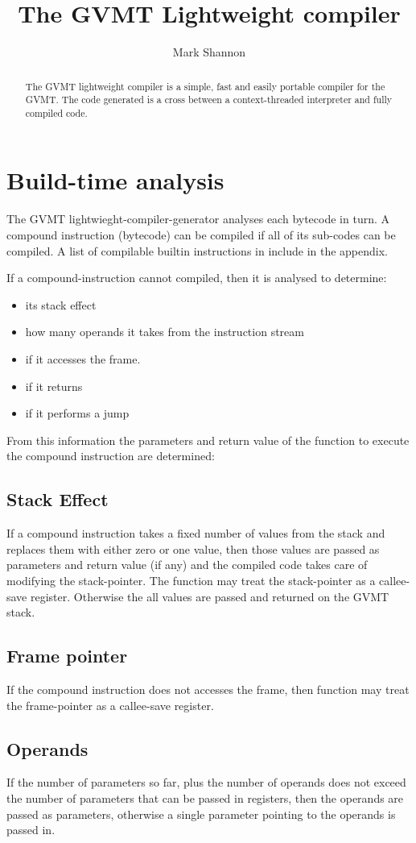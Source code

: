 \documentclass[a4paper,10pt]{article}
\title{The GVMT Lightweight compiler}
\author{Mark Shannon}
\date{}
\begin{document}
\maketitle

\begin{abstract}
The GVMT lightweight compiler is a simple, fast and easily portable compiler for the GVMT.
The code generated is a cross between a context-threaded interpreter and fully compiled code.
\end{abstract}

\section{Build-time analysis}
The GVMT lightwieght-compiler-generator analyses each bytecode in turn. A compound instruction (bytecode) can be compiled if all of its sub-codes can be compiled. A list of compilable builtin instructions in include in the appendix.

If a compound-instruction cannot compiled, then it is analysed to determine:
\begin{itemize}
\item its stack effect
\item how many operands it takes from the instruction stream
\item if it accesses the frame.
\item if it returns
\item if it performs a jump
\end{itemize}

From this information the parameters and return value of the function to execute the compound instruction are determined:
\subsection{Stack Effect}
If a compound instruction takes a fixed number of values from the stack and replaces them with either zero or one value, then those values are passed as parameters and return value (if any) and the compiled code takes care of modifying the stack-pointer. The function may treat the stack-pointer as a callee-save register.
Otherwise the all values are passed and returned on the GVMT stack.
\subsection{Frame pointer}
If the compound instruction does not accesses the frame, then function may treat the frame-pointer as a callee-save register.
\subsection{Operands}
If the number of parameters so far, plus the number of operands does not exceed the number of parameters that can be passed in registers, then the operands are passed as parameters, otherwise a single parameter pointing to the operands is passed in.
\end{document}
